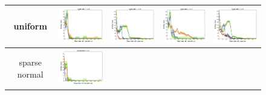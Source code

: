 \documentclass{article}
\renewcommand\[{\begin{equation}}
\renewcommand\]{\end{equation}}
\newcommand{\stefano}[1]{{\bf \textcolor{green}{{\fbox{Stefano:} #1}}}}
\begin{document}

\begin{figure}[t]
    \centering
    {\footnotesize
    \begin{tabular}{ccccc}
        {\sc uniform} &
        \includegraphics[align=c,width=10em]{figures/synthetic_vs_self_4_uniform_per_iter_loss} &
        \includegraphics[align=c,width=10em]{figures/synthetic_vs_self_4_uniform_per_query_loss} &
        \includegraphics[align=c,width=10em]{figures/synthetic_vs_self_5_uniform_per_iter_loss} &
        \includegraphics[align=c,width=10em]{figures/synthetic_vs_self_5_uniform_per_query_loss}
        \\
        \hline
        {\sc sparse normal} &        
        \includegraphics[align=c,width=10em]{figures/synthetic_vs_self_4_normal_sparse_per_iter_loss} &

\end{tabular}}
\end{figure}
\end{document}
